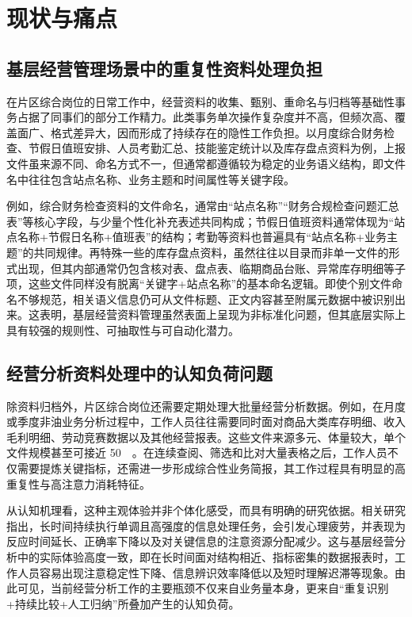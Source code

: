 \section{现状与痛点}

\subsection{基层经营管理场景中的重复性资料处理负担}

在片区综合岗位的日常工作中，经营资料的收集、甄别、重命名与归档等基础性事务占据了同事们的部分工作精力。此类事务单次操作复杂度并不高，但频次高、覆盖面广、格式差异大，因而形成了持续存在的隐性工作负担。以月度综合财务检查、节假日值班安排、人员考勤汇总、技能鉴定统计以及库存盘点资料为例，上报文件虽来源不同、命名方式不一，但通常都遵循较为稳定的业务语义结构，即文件名中往往包含站点名称、业务主题和时间属性等关键字段。

例如，综合财务检查资料的文件命名，通常由“站点名称”“财务合规检查问题汇总表”等核心字段，与少量个性化补充表述共同构成；节假日值班资料通常体现为“站点名称+节假日名称+值班表”的结构；考勤等资料也普遍具有“站点名称+业务主题”的共同规律。再特殊一些的库存盘点资料，虽然往往以目录而非单一文件的形式出现，但其内部通常仍包含核对表、盘点表、临期商品台账、异常库存明细等子项，这些文件同样没有脱离“关键字+站点名称”的基本命名逻辑。即使个别文件命名不够规范，相关语义信息仍可从文件标题、正文内容甚至附属元数据中被识别出来。这表明，基层经营资料管理虽然表面上呈现为非标准化问题，但其底层实际上具有较强的规则性、可抽取性与可自动化潜力。

\subsection{经营分析资料处理中的认知负荷问题}

除资料归档外，片区综合岗位还需要定期处理大批量经营分析数据。例如，在月度或季度非油业务分析过程中，工作人员往往需要同时面对商品大类库存明细、收入毛利明细、劳动竞赛数据以及其他经营报表。这些文件来源多元、体量较大，单个文件规模甚至可接近 \SI{50}{\mega\byte}。在连续查阅、筛选和比对大量表格之后，工作人员不仅需要提炼关键指标，还需进一步形成综合性业务简报，其工作过程具有明显的高重复性与高注意力消耗特征。

从认知机理看，这种主观体验并非个体化感受，而具有明确的研究依据。相关研究指出，长时间持续执行单调且高强度的信息处理任务，会引发心理疲劳，并表现为反应时间延长、正确率下降以及对关键信息的注意资源分配减少\cite{guo2016mental,oken2006vigilance}。这与基层经营分析中的实际体验高度一致，即在长时间面对结构相近、指标密集的数据报表时，工作人员容易出现注意稳定性下降、信息辨识效率降低以及短时理解迟滞等现象。由此可见，当前经营分析工作的主要瓶颈不仅来自业务量本身，更来自“重复识别+持续比较+人工归纳”所叠加产生的认知负荷。

